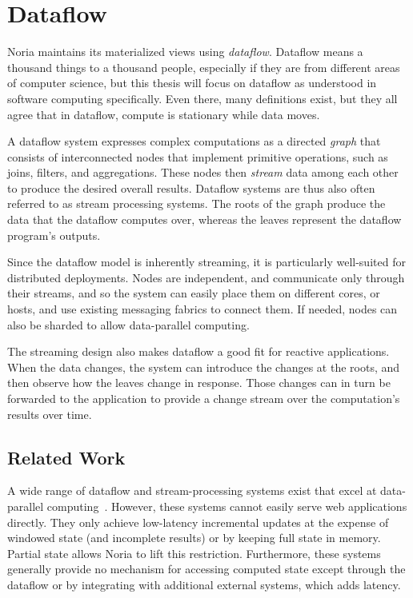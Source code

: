 \section{Dataflow}

Noria maintains its materialized views using \textit{dataflow}. Dataflow means a
thousand things to a thousand people, especially if they are from different
areas of computer science, but this thesis will focus on dataflow as understood
in software computing specifically. Even there, many definitions exist, but they
all agree that in dataflow, compute is stationary while data moves.

A dataflow system expresses complex computations as a directed \emph{graph} that
consists of interconnected nodes that implement primitive operations, such as
joins, filters, and aggregations. These nodes then \emph{stream} data among each
other to produce the desired overall results. Dataflow systems are thus also
often referred to as stream processing systems. The roots of the graph produce
the data that the dataflow computes over, whereas the leaves represent the
dataflow program's outputs.

Since the dataflow model is inherently streaming, it is particularly well-suited
for distributed deployments. Nodes are independent, and communicate only through
their streams, and so the system can easily place them on different cores, or
hosts, and use existing messaging fabrics to connect them. If needed, nodes can
also be sharded to allow data-parallel computing.

The streaming design also makes dataflow a good fit for reactive applications.
When the data changes, the system can introduce the changes at the roots, and
then observe how the leaves change in response. Those changes can in turn be
forwarded to the application to provide a change stream over the computation's
results over time.

\subsection{Related Work}

A wide range of dataflow and stream-processing systems exist that excel at
data-parallel computing~\cite{dryad, naiad, storm, heron, flink, millwheel,
spark-streaming, stanford-stream, s-store, cloud-dataflow}. However, these
systems cannot easily serve web applications directly. They only achieve
low-latency incremental updates at the expense of windowed state (and incomplete
results) or by keeping full state in memory. Partial state allows Noria to lift
this restriction. Furthermore, these systems generally provide no mechanism for
accessing computed state except through the dataflow or by integrating with
additional external systems, which adds latency.

